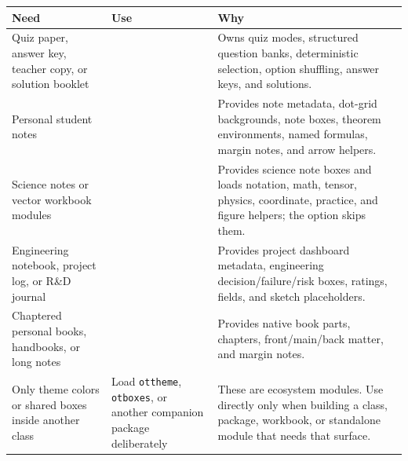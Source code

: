 \documentclass[10pt,a4paper]{article}
\newcommand{\code}[1]{\texttt{\small\detokenize{#1}}}
\newcommand{\pkg}[1]{\texttt{#1}}
\begin{document}
\begin{longtable}{p{}p{}p{}}
  \toprule
  Need                                                      & Use                                                                          & Why                                                                                                                                                            \\
  \midrule
  Quiz paper, answer key, teacher copy, or solution booklet & \code{\documentclass{physicsquiz}}                                           & Owns quiz modes, structured question banks, deterministic selection, option shuffling, answer keys, and solutions.                                             \\
  Personal student notes                                    & \code{\documentclass{studentnotes}}                                          & Provides note metadata, dot-grid backgrounds, note boxes, theorem environments, named formulas, margin notes, and arrow helpers.                               \\
  Science notes or vector workbook modules                  & \code{\documentclass{otscience}}                                             & Provides science note boxes and loads notation, math, tensor, physics, coordinate, practice, and figure helpers; the \code{minimal} option skips them. \\
  Engineering notebook, project log, or R\&D journal        & \code{\documentclass{otengineering}}                                         & Provides project dashboard metadata, engineering decision/failure/risk boxes, ratings, fields, and sketch placeholders.                                        \\
  Chaptered personal books, handbooks, or long notes        & \code{\documentclass{otbook}}                                                & Provides native book parts, chapters, front/main/back matter, and margin notes.                                               \\
  Only theme colors or shared boxes inside another class    & Load \pkg{ottheme}, \pkg{otboxes}, or another companion package deliberately & These are ecosystem modules. Use directly only when building a class, package, workbook, or standalone module that needs that surface.                         \\
  \bottomrule
\end{longtable}
\end{document}
